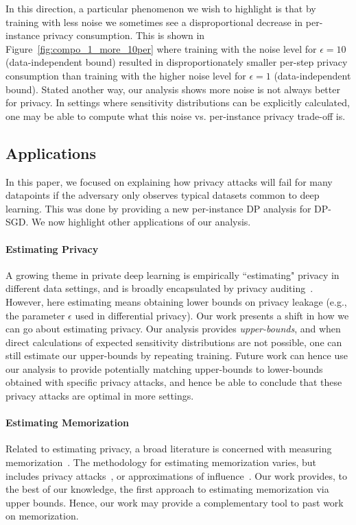 In this direction, a particular phenomenon we wish to highlight is that by training with less noise we sometimes see a disproportional decrease in per-instance privacy consumption. This is shown in Figure~\ref{fig:compo_1_more_10per} where training with the noise level for $\epsilon=10$ (data-independent bound) resulted in disproportionately smaller per-step privacy consumption than training with the higher noise level for $\epsilon=1$ (data-independent bound). Stated another way, our analysis shows more noise is not always better for privacy. In settings where sensitivity distributions can be explicitly calculated, one may be able to compute what this noise vs. per-instance privacy trade-off is.




\subsection{Applications}
\label{ssec:apps}


In this paper, we focused on explaining how privacy attacks will fail for many datapoints if the adversary only observes typical datasets common to deep learning. This was done by providing a new per-instance DP analysis for DP-SGD. We now highlight other applications of our analysis.



\paragraph{Estimating Privacy} A growing theme in private deep learning is empirically ``estimating" privacy in different data settings, and is broadly encapsulated by privacy auditing~\cite{nasr2021adversary,Nasr:2023, Zanella-Beguelin:2022, Jagielski:2020}. However, here estimating means obtaining lower bounds on privacy leakage (e.g., the parameter $\epsilon$ used in differential privacy). Our work presents a shift in how we can go about estimating privacy. Our analysis provides \emph{upper-bounds}, and when direct calculations of expected sensitivity distributions are not possible, one can still estimate our upper-bounds by repeating training. Future work can hence use our analysis to provide potentially matching upper-bounds to lower-bounds obtained with specific privacy attacks, and hence be able to conclude that these privacy attacks are optimal in more settings.

\paragraph{Estimating Memorization} Related to estimating privacy, a broad literature is concerned with measuring memorization~\cite{carlini2019secret,zhang2019identity,feldman2020neural,carlini2022quantifying,tirumala2022memorization}. The methodology for estimating memorization varies, but includes privacy attacks~\cite{carlini2022quantifying}, or approximations of influence~\cite{carlini2019secret,feldman2020neural}. Our work provides, to the best of our knowledge, the first approach to estimating memorization via upper bounds. Hence, our work may provide a complementary tool to past work on memorization. 


